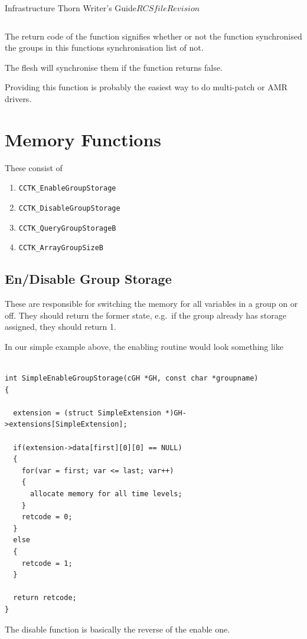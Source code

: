 \begin{cactuspart}{Infrastructure Thorn Writer's Guide}{$RCSfile$}{$Revision$}
\begin{verbatim}
\end{verbatim}

The return code of the function signifies whether or not the function
synchronised the groups in this functions synchronisation list of not.

The flesh will synchronise them if the function returns false.

Providing this function is probably the easiest way to do multi-patch or
AMR drivers.

\section{Memory Functions}

These consist of
\begin{enumerate}
\item{} {\tt CCTK\_EnableGroupStorage}
\item{} {\tt CCTK\_DisableGroupStorage}
\item{} {\tt CCTK\_QueryGroupStorageB}
\item{} {\tt CCTK\_ArrayGroupSizeB}
\end{enumerate}

\subsection{En/Disable Group Storage}

These are responsible for switching the memory for all variables
in a group on or off.  They should return the former state, e.g.\
if the group already has storage assigned, they should return 1.

In our simple example above, the enabling routine would look
something like

\begin{verbatim}

int SimpleEnableGroupStorage(cGH *GH, const char *groupname)
{

  extension = (struct SimpleExtension *)GH->extensions[SimpleExtension];

  if(extension->data[first][0][0] == NULL)
  {
    for(var = first; var <= last; var++)
    {
      allocate memory for all time levels;
    }
    retcode = 0;
  }
  else
  {
    retcode = 1;
  }

  return retcode;
}

\end{verbatim}

The disable function is basically the reverse of the enable one.


\end{cactuspart}
